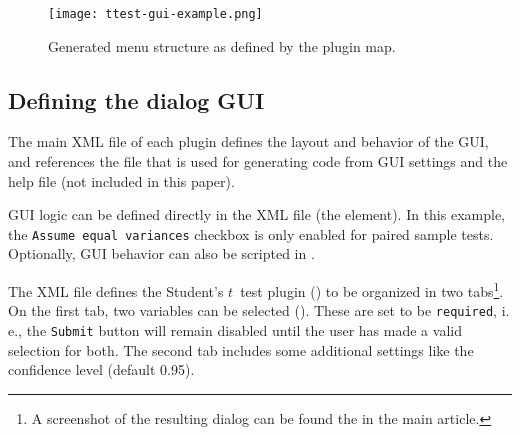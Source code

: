 \begin{figure}[t!]
 \centering
 \texttt{[image: ttest-gui-example.png]}
 \caption{Generated menu structure as defined by the plugin map.}
 \label{fig:ttest-gui-example}
\end{figure}


\subsection {Defining the dialog GUI}
\label{sec:defining_dialog_ui}
The main XML file of each plugin defines the layout and behavior of the GUI, and references the
 file that is used for generating  code from GUI settings and the help file (not included in this paper).

GUI logic can be defined directly in the XML file (the  element).
In this example, the \texttt{Assume equal variances} checkbox is only enabled for paired sample tests.
Optionally, GUI behavior can also be scripted in .

The XML file defines the Student's $t$~test plugin () to be organized in two tabs\footnote{
  A screenshot of the resulting dialog can be found the in the main article.
}.
On the first tab, two variables can be selected (). These are set to be \texttt{required}, i.\,e.,
the \texttt{Submit} button will remain disabled until the user has made a valid selection for both. The second tab includes some
additional settings like the confidence level (default 0.95).


